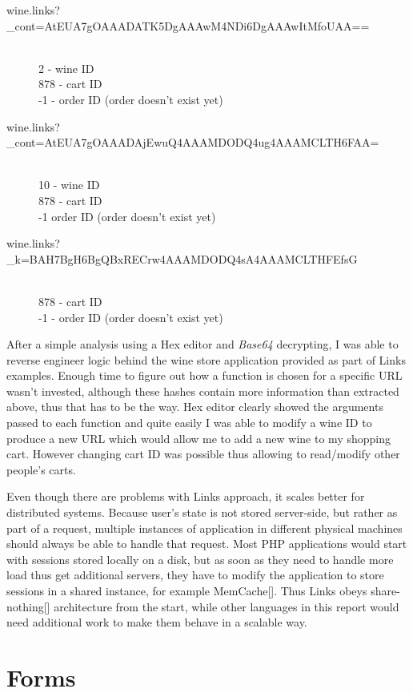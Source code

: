 \begin{description}
  \item[wine.links?\_cont=AtEUA7gOAAADATK5DgAAAwM4NDi6DgAAAwItMfoUAA==] \hfill \\
  2 - wine ID \\
  878 - cart ID \\
  -1 - order ID (order doesn't exist yet)
  \item[wine.links?\_cont=AtEUA7gOAAADAjEwuQ4AAAMDODQ4ug4AAAMCLTH6FAA=] \hfill \\
  10 - wine ID \\
  878 - cart ID \\
  -1 order ID (order doesn't exist yet)
  \item[wine.links?\_k=BAH7BgH6BgQBxRECrw4AAAMDODQ4sA4AAAMCLTHFEfsG] \hfill \\
  878 - cart ID \\
  -1 - order ID (order doesn't exist yet)
\end{description}

After a simple analysis using a Hex editor and \textit{Base64} decrypting, I was able to reverse engineer logic behind the wine store application provided as part of Links examples. Enough time to figure out how a function is chosen for a specific URL wasn't invested, although these hashes contain more information than extracted above, thus that has to be the way. Hex editor clearly showed the arguments passed to each function and quite easily I was able to modify a wine ID to produce a new URL which would allow me to add a new wine to my shopping cart. However changing cart ID was possible thus allowing to read/modify other people's carts.

Even though there are problems with Links approach, it scales better for distributed systems. Because user's state is not stored server-side, but rather as part of a request, multiple instances of application in different physical machines should always be able to handle that request. Most PHP applications would start with sessions stored locally on a disk, but as soon as they need to handle more load thus get additional servers, they have to modify the application to store sessions in a shared instance, for example MemCache[]. Thus Links obeys share-nothing[] architecture from the start, while other languages in this report would need additional work to make them behave in a scalable way.

\section{Forms}

